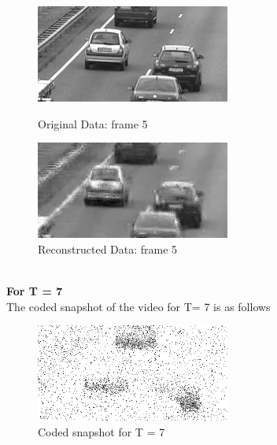 \documentclass[12pt]{article}
\begin{document}
\begin{itemize}
\begin{enumerate}
    \begin{figure}[H]
        \centering
        \begin{minipage}{.45\textwidth}
            \centering
            \includegraphics[width=\linewidth]{results/cars_5_orig_5.png}
            \caption*{Original Data: frame 5}
        \end{minipage}
        \begin{minipage}{.45\textwidth}
            \centering
            \includegraphics[width=\linewidth]{results/cars_5_recon_5.png}
            \caption*{Reconstructed Data: frame 5}
        \end{minipage}
    \end{figure}
    
    \\
    \textbf{For T = 7} \\
    The coded snapshot of the video for T= 7 is as follows
    \begin{figure}[H]
        \centering
        \includegraphics[width=0.5\linewidth]{results/cars_noisy_snapshot_7.png}
        \caption*{Coded snapshot for T = 7}
    \end{figure}


\end{enumerate}
\end{itemize}
\end{document}
